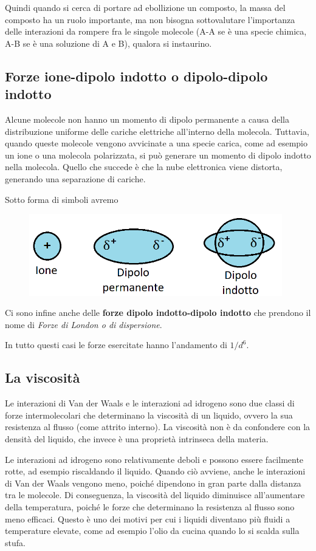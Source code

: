 \vspace{0.2cm}Quindi quando si cerca di portare ad ebollizione un composto, la massa del composto ha un ruolo importante, ma non bisogna sottovalutare l'importanza delle interazioni da rompere fra le singole molecole (A-A se è una specie chimica, A-B se è una soluzione di A e B), qualora si instaurino.

\subsection{Forze ione-dipolo indotto o dipolo-dipolo indotto}
Alcune molecole non hanno un momento di dipolo permanente a causa della distribuzione uniforme delle cariche elettriche all'interno della molecola. Tuttavia, quando queste molecole vengono avvicinate a una specie carica, come ad esempio un ione o una molecola polarizzata, si può generare un momento di dipolo indotto nella molecola. Quello che succede è che la nube elettronica viene distorta, generando una separazione di cariche. 

Sotto forma di simboli avremo

\begin{figure}[htp]
    \centering
    \includegraphics[width=11cm]{immagini/ioni_e_momenti_di_dipolo.png}
\end{figure}

Ci sono infine anche delle \textbf{forze dipolo indotto-dipolo indotto} che prendono il nome di \textit{Forze di London o di dispersione}.

In tutto questi casi le forze esercitate hanno l'andamento di $1/d^6$.
\subsection{La viscosità}
Le interazioni di Van der Waals e le interazioni ad idrogeno sono due classi di forze intermolecolari che determinano la viscosità di un liquido, ovvero la sua resistenza al flusso (come attrito interno). La viscosità non è da confondere con la densità del liquido, che invece è una proprietà intrinseca della materia.

Le interazioni ad idrogeno sono relativamente deboli e possono essere facilmente rotte, ad esempio riscaldando il liquido. Quando ciò avviene, anche le interazioni di Van der Waals vengono meno, poiché dipendono in gran parte dalla distanza tra le molecole. Di conseguenza, la viscosità del liquido diminuisce all'aumentare della temperatura, poiché le forze che determinano la resistenza al flusso sono meno efficaci. Questo è uno dei motivi per cui i liquidi diventano più fluidi a temperature elevate, come ad esempio l'olio da cucina quando lo si scalda sulla stufa.